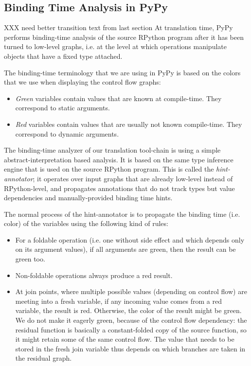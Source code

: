 \subsection{Binding Time Analysis in PyPy}

XXX need better transition text from last section
At translation time, PyPy performs binding-time analysis of the source
RPython program after it has been turned to low-level graphs, i.e. at
the level at which operations manipulate objects that have a fixed type
attached.

The binding-time terminology that we are using in PyPy is based on the
colors that we use when displaying the control flow graphs:

\begin{itemize}
\item \emph{Green} variables contain values that are known at compile-time.
They correspond to static arguments.
\item \emph{Red} variables contain values that are usually not known
compile-time. They correspond to dynamic arguments.
\end{itemize}

The binding-time analyzer of our translation tool-chain is using a simple
abstract-interpretation based analysis. It is based on the
same type inference engine that is used on the source RPython program.
This is called the \emph{hint-annotator}; it
operates over input graphs that are already low-level instead of
RPython-level,  
and propagates annotations that do not track types but
value dependencies and manually-provided binding time hints.

The normal process of the hint-annotator is to propagate the binding
time (i.e. color) of the variables using the following kind of rules:

\begin{itemize}
\item For a foldable operation (i.e. one without side effect and which depends
only on its argument values), if all arguments are green, then the result can
be green too.

\item Non-foldable operations always produce a red result.

\item At join points, where multiple possible values (depending on control
flow) are meeting into a fresh variable, if any incoming value comes from a red
variable, the result is red.  Otherwise, the color of the result might be
green.  We do not make it eagerly green, because of the control flow
dependency: the residual function is basically a constant-folded copy of the
source function, so it might retain some of the same control flow.  The value
that needs to be stored in the fresh join variable thus depends on which
branches are taken in the residual graph.
\end{itemize}

